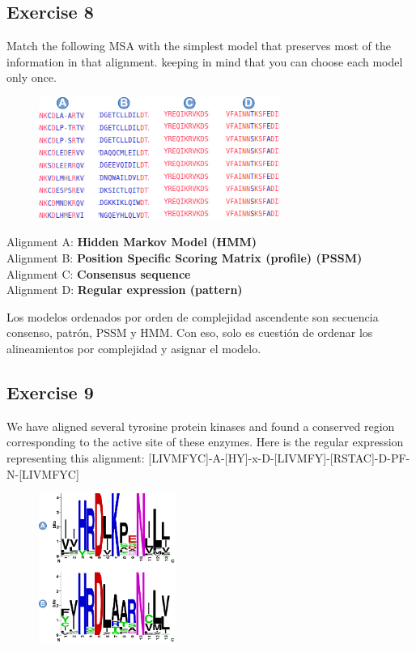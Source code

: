 \subsection{Exercise 8}
Match the following MSA with the simplest model that preserves most of the information in that alignment. keeping in mind that you can choose each model only once.
\begin{figure}[htbp]
\centering
\includegraphics[width = 0.7\textwidth]{figs/exam-ex8.png}
\end{figure}

\noindent
Alignment A: \textbf{Hidden Markov Model (HMM)} \\
Alignment B: \textbf{Position Specific Scoring Matrix (profile) (PSSM)} \\
Alignment C: \textbf{Consensus sequence} \\
Alignment D: \textbf{Regular expression (pattern)}

Los modelos ordenados por orden de complejidad ascendente son secuencia consenso, patrón, PSSM y HMM. Con eso, solo es cuestión de ordenar los alineamientos por complejidad y asignar el modelo.

\subsection{Exercise 9}
We have aligned several tyrosine protein kinases and found a conserved region corresponding to the active site of these enzymes. Here is the regular expression representing this alignment: [LIVMFYC]-{A}-[HY]-x-D-[LIVMFY]-[RSTAC]-{D}-{PF}-N-[LIVMFYC] 

\begin{figure}[htbp]
\centering
\includegraphics[width = 0.4\textwidth]{figs/exam-ex9.png}
\end{figure}

